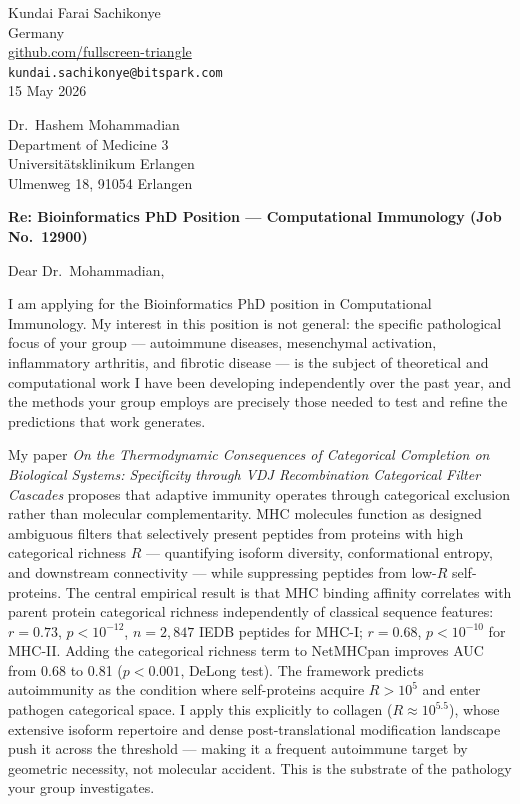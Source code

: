 \documentclass[12pt,a4paper]{article}
\begin{document}
\begin{flushright}
Kundai Farai Sachikonye \\
Germany \\
\href{https://github.com/fullscreen-triangle}{github.com/fullscreen-triangle} \\
\texttt{kundai.sachikonye@bitspark.com} \\[6pt]
15 May 2026
\end{flushright}

\vspace{1em}

Dr.\ Hashem Mohammadian \\
Department of Medicine 3 \\
Universitätsklinikum Erlangen \\
Ulmenweg 18, 91054 Erlangen

\vspace{1.5em}

\textbf{Re: Bioinformatics PhD Position --- Computational Immunology (Job No.\ 12900)}

\vspace{1em}

Dear Dr.\ Mohammadian,

I am applying for the Bioinformatics PhD position in Computational Immunology.
My interest in this position is not general: the specific pathological focus of
your group --- autoimmune diseases, mesenchymal activation, inflammatory
arthritis, and fibrotic disease --- is the subject of theoretical and
computational work I have been developing independently over the past year,
and the methods your group employs are precisely those needed to test and
refine the predictions that work generates.

My paper \textit{On the Thermodynamic Consequences of Categorical Completion on
Biological Systems: Specificity through VDJ Recombination Categorical Filter
Cascades} proposes that adaptive immunity operates through categorical exclusion
rather than molecular complementarity. MHC molecules function as designed
ambiguous filters that selectively present peptides from proteins with high
categorical richness $R$ --- quantifying isoform diversity, conformational
entropy, and downstream connectivity --- while suppressing peptides from
low-$R$ self-proteins. The central empirical result is that MHC binding affinity
correlates with parent protein categorical richness independently of classical
sequence features: $r = 0.73$, $p < 10^{-12}$, $n = 2{,}847$ IEDB peptides for
MHC-I; $r = 0.68$, $p < 10^{-10}$ for MHC-II. Adding the categorical richness
term to NetMHCpan improves AUC from 0.68 to 0.81 ($p < 0.001$, DeLong test).
The framework predicts autoimmunity as the condition where self-proteins acquire
$R > 10^5$ and enter pathogen categorical space. I apply this explicitly to
collagen ($R \approx 10^{5.5}$), whose extensive isoform repertoire and dense
post-translational modification landscape push it across the threshold --- making
it a frequent autoimmune target by geometric necessity, not molecular accident.
This is the substrate of the pathology your group investigates.
\end{document}
